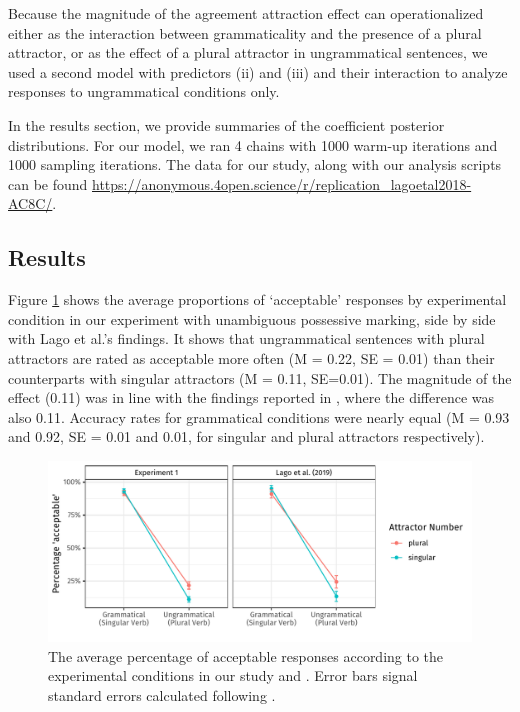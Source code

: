 \documentclass[apacite,linguex]{glossa}\usepackage[]{graphicx}\usepackage[]{color}
\makeatletter
\def\maxwidth{ %
  \ifdim\Gin@nat@width>\linewidth
    \linewidth
  \else
    \Gin@nat@width
  \fi
}
\newenvironment{knitrout}{}{} %
\makeatother
\begin{document}
Because the magnitude of the agreement attraction effect can operationalized either as the interaction between grammaticality and the presence of a plural attractor, or as the effect of a plural attractor in ungrammatical sentences, we used a second model with predictors (ii) and (iii) and their interaction to analyze responses to ungrammatical conditions only.


In the results section, we provide summaries of the coefficient posterior distributions. For our model, we ran 4 chains with 1000 warm-up iterations and 1000 sampling iterations. The data for our study, along with our analysis scripts can be found \url{https://anonymous.4open.science/r/replication_lagoetal2018-AC8C/}.


\subsection{Results}

Figure \ref{fig:AverageResponses} shows the average proportions of `acceptable' responses by experimental condition in our experiment with unambiguous possessive marking, side by side with Lago et al.'s findings. It shows that ungrammatical sentences with plural attractors are rated as acceptable more often (M = 0.22, SE = 0.01) than their counterparts with singular attractors (M = 0.11, SE=0.01). The magnitude of the effect (0.11) was in line with the findings reported in \citet{LagoEtAl:2019}, where the difference was also 0.11. Accuracy rates for grammatical conditions were nearly equal (M = 0.93 and 0.92, SE = 0.01 and 0.01, for singular and plural attractors respectively).


\begin{figure}[hbt!]
\centering

\begin{knitrout}
\color{fgcolor}

{\centering \includegraphics[width=\maxwidth]{figure/AverageResponses-1} 

}


\end{knitrout}

\caption{The average percentage of acceptable responses according to the experimental conditions in our study and \citet{LagoEtAl:2019}. Error bars signal standard errors calculated following \citet{Morey:2008,Cousineau:2005}.}
\label{fig:AverageResponses}
\end{figure}
\end{document}
